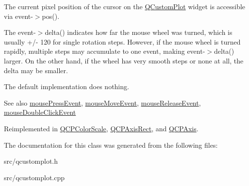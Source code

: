 The current pixel position of the cursor on the \hyperlink{classQCustomPlot}{Q\+Custom\+Plot} widget is accessible via {\ttfamily event-\/$>$pos()}.

The {\ttfamily event-\/$>$delta()} indicates how far the mouse wheel was turned, which is usually +/-\/ 120 for single rotation steps. However, if the mouse wheel is turned rapidly, multiple steps may accumulate to one event, making {\ttfamily event-\/$>$delta()} larger. On the other hand, if the wheel has very smooth steps or none at all, the delta may be smaller.

The default implementation does nothing.

\begin{DoxySeeAlso}{See also}
\hyperlink{classQCPLayerable_af6567604818db90f4fd52822f8bc8376}{mouse\+Press\+Event}, \hyperlink{classQCPLayerable_a9eee1ba47fd69be111059ca3881933e4}{mouse\+Move\+Event}, \hyperlink{classQCPLayerable_aa0d79b005686f668622bbe66ac03ba2c}{mouse\+Release\+Event}, \hyperlink{classQCPLayerable_a4171e2e823aca242dd0279f00ed2de81}{mouse\+Double\+Click\+Event} 
\end{DoxySeeAlso}


Reimplemented in \hyperlink{classQCPColorScale_a63cf19be184f6670c9495ad3a9a1baeb}{Q\+C\+P\+Color\+Scale}, \hyperlink{classQCPAxisRect_a93eeaa0c127d6d6fe8171b2455080262}{Q\+C\+P\+Axis\+Rect}, and \hyperlink{classQCPAxis_a71643d27524a843230b5ba68085b3d9b}{Q\+C\+P\+Axis}.



The documentation for this class was generated from the following files\+:\begin{DoxyCompactItemize}
\item 
src/qcustomplot.\+h\item 
src/qcustomplot.\+cpp\end{DoxyCompactItemize}
